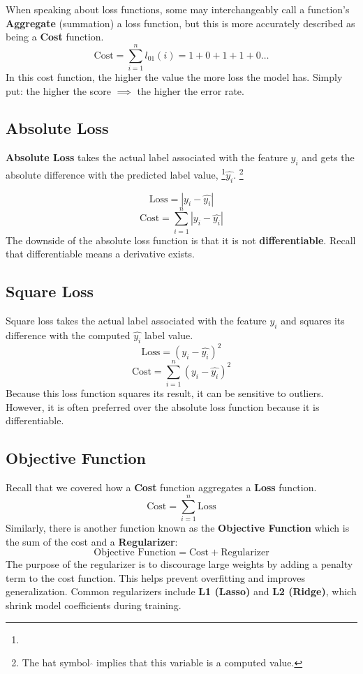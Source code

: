 When speaking about loss functions, some may interchangeably call a function's \textbf{Aggregate} (summation) a loss function, but this is more accurately described as being a \textbf{Cost} function.
\[ 
\text{Cost} = \sum_{i=1}^{n} l_{01}(i) = 1 + 0 + 1 + 1 + 0 \ldots
\]
In this cost function, the higher the value the more loss the model has. Simply put: the higher the score $\implies$ the higher the error rate.

\subsection{Absolute Loss}
\textbf{Absolute Loss} takes the actual label associated with the feature $y_i$ and gets the absolute difference with the predicted label value, \footnote{}$\hat{y_i}$.
\footnote[1]{The hat symbol $\hat{}$ implies that this variable is a computed value.}

\[ 
\text{Loss} = |y_i - \hat{y_i}|
\]
\[ 
\text{Cost} = \sum_{i=1}^{n} |y_i - \hat{y_i}|
\]
The downside of the absolute loss function is that it is not \textbf{differentiable}. Recall that differentiable means a derivative exists.

\subsection{Square Loss}
Square loss takes the actual label associated with the feature $y_i$ and squares its difference with the computed $\hat{y_i}$ label value.
\[ 
\text{Loss} = (y_i - \hat{y_i})^2
\]
\[ 
\text{Cost} = \sum_{i=1}^{n} (y_i - \hat{y_i})^2
\]
Because this loss function squares its result, it can be sensitive to outliers. However, it is often preferred over the absolute loss function because it is differentiable.

\subsection{Objective Function}
Recall that we covered how a \textbf{Cost} function aggregates a \textbf{Loss} function.
\[ 
\text{Cost} = \sum_{i=1}^{n} \text{Loss}
\]
Similarly, there is another function known as the \textbf{Objective Function} which is the sum of the cost and a \textbf{Regularizer}:
\[ 
\text{Objective Function} = \text{Cost} + \text{Regularizer}
\]
The purpose of the regularizer is to discourage large weights by adding a penalty term to the cost function. This helps prevent overfitting and improves generalization. Common regularizers include \textbf{L1 (Lasso)} and \textbf{L2 (Ridge)}, which shrink model coefficients during training. %


